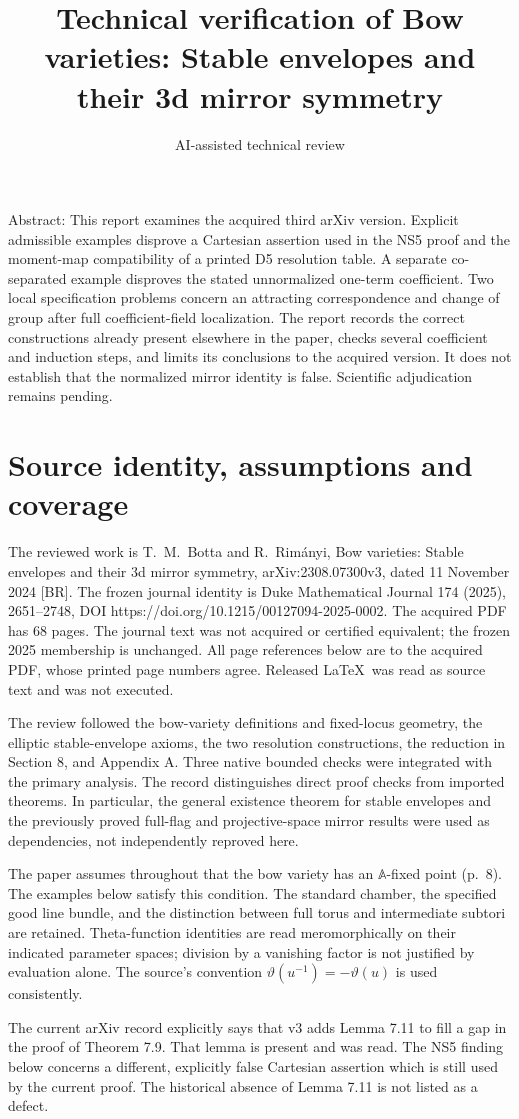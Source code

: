 \documentclass[10pt]{article}
\title{Technical verification of
Bow varieties: Stable envelopes
and their 3d mirror symmetry}
\author{AI-assisted technical review}
\date{}
\begin{document}
\maketitle
Abstract: This report examines the acquired third arXiv version. Explicit admissible examples disprove a Cartesian assertion used in the NS5 proof and the moment-map compatibility of a printed D5 resolution table. A separate co-separated example disproves the stated unnormalized one-term coefficient. Two local specification problems concern an attracting correspondence and change of group after full coefficient-field localization. The report records the correct constructions already present elsewhere in the paper, checks several coefficient and induction steps, and limits its conclusions to the acquired version. It does not establish that the normalized mirror identity is false. Scientific adjudication remains pending.\par
\section*{Source identity, assumptions and coverage}
The reviewed work is T. M. Botta and R. Rimányi, Bow varieties: Stable envelopes and their 3d mirror symmetry, arXiv:2308.07300v3, dated 11 November 2024 [BR]. The frozen journal identity is Duke Mathematical Journal 174 (2025), 2651–2748, DOI https://doi.org/10.1215/00127094-2025-0002. The acquired PDF has 68 pages. The journal text was not acquired or certified equivalent; the frozen 2025 membership is unchanged. All page references below are to the acquired PDF, whose printed page numbers agree. Released LaTeX was read as source text and was not executed.\par
The review followed the bow-variety definitions and fixed-locus geometry, the elliptic stable-envelope axioms, the two resolution constructions, the reduction in Section 8, and Appendix A. Three native bounded checks were integrated with the primary analysis. The record distinguishes direct proof checks from imported theorems. In particular, the general existence theorem for stable envelopes and the previously proved full-flag and projective-space mirror results were used as dependencies, not independently reproved here.\par
The paper assumes throughout that the bow variety has an \(\mathbb A\)-fixed point (p. 8). The examples below satisfy this condition. The standard chamber, the specified good line bundle, and the distinction between full torus and intermediate subtori are retained. Theta-function identities are read meromorphically on their indicated parameter spaces; division by a vanishing factor is not justified by evaluation alone. The source’s convention \(\vartheta(u^{-1})=-\vartheta(u)\) is used consistently.\par
The current arXiv record explicitly says that v3 adds Lemma 7.11 to fill a gap in the proof of Theorem 7.9. That lemma is present and was read. The NS5 finding below concerns a different, explicitly false Cartesian assertion which is still used by the current proof. The historical absence of Lemma 7.11 is not listed as a defect.\par
\end{document}
